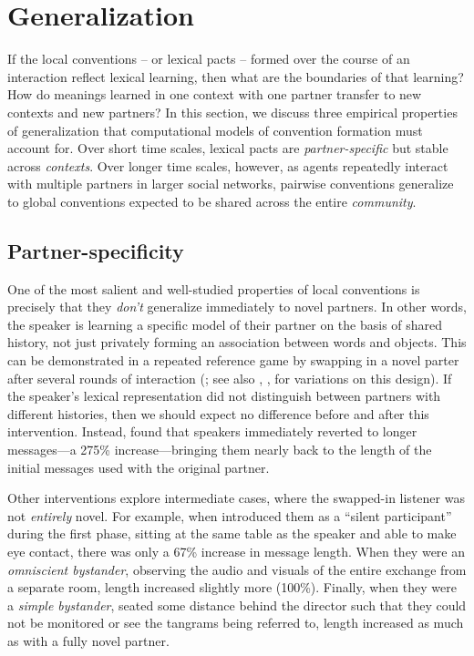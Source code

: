 \documentclass[11pt, floatsintext, jou]{apa6}
\begin{document}
\section{Generalization}

If the local conventions -- or lexical pacts -- formed over the course of an interaction reflect lexical learning, then what are the boundaries of that learning? How do meanings learned in one context with one partner transfer to new contexts and new partners? %
In this section, we discuss three empirical properties of generalization that computational models of convention formation must account for. Over short time scales, lexical pacts are \emph{partner-specific} but stable across \emph{contexts}. Over longer time scales, however, as agents repeatedly interact with multiple partners in larger social networks, pairwise conventions generalize to global conventions expected to be shared across the entire \emph{community}.

\subsection{Partner-specificity}

One of the most salient and well-studied properties of local conventions is precisely that they \emph{don't} generalize immediately to novel partners. In other words, the speaker is learning a specific model of their partner on the basis of shared history, not just privately forming an association between words and objects. This can be demonstrated in a repeated reference game by  swapping in a novel parter after several rounds of interaction (; see also , ,  for variations on this design). If the speaker's lexical representation did not distinguish between partners with different histories, then we should expect no difference before and after this intervention. Instead,  found that speakers immediately reverted to longer messages---a 275\% increase---bringing them nearly back to the length of the initial messages used with the original partner. 

Other interventions explore intermediate cases, where the swapped-in listener was not \emph{entirely} novel. For example, when  introduced them as a ``silent participant'' during the first phase, sitting at the same table as the speaker and able to make eye contact, there was only a 67\% increase in message length. When they were an \emph{omniscient bystander}, observing the audio and visuals of the entire exchange from a separate room, length increased slightly more (100\%). Finally, when they were a \emph{simple bystander}, seated some distance behind the director such that they could not be monitored or see the tangrams being referred to, length increased as much as with a fully novel partner. 
\end{document}
